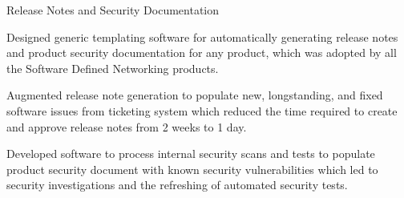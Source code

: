 \begin{cventries}
  \cventry
    {} {Release Notes and Security Documentation} {} {} {
      \begin{cvitems}
        \item {Designed generic templating software for automatically generating release notes and product security documentation for any product, which was adopted by all the Software Defined Networking products.}
        \item {Augmented release note generation to populate new, longstanding, and fixed software issues from ticketing system which reduced the time required to create and approve release notes from 2 weeks to 1 day.}
        \item {Developed software to process internal security scans and tests to populate product security document with known security vulnerabilities which led to security investigations and the refreshing of automated security tests.}
      \end{cvitems}
    }


\end{cventries}
